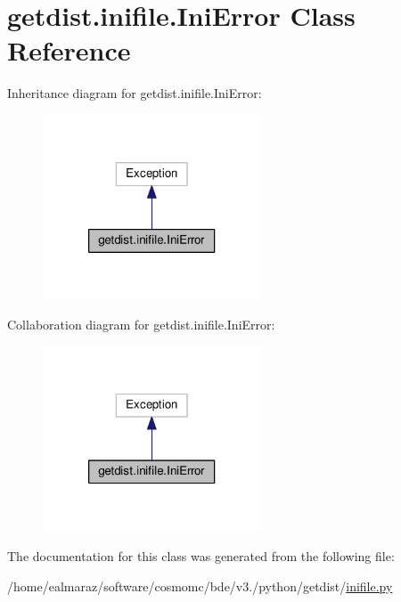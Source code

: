 \hypertarget{classgetdist_1_1inifile_1_1IniError}{}\section{getdist.\+inifile.\+Ini\+Error Class Reference}
\label{classgetdist_1_1inifile_1_1IniError}


Inheritance diagram for getdist.\+inifile.\+Ini\+Error\+:
\nopagebreak
\begin{figure}[H]
\begin{center}
\leavevmode
\includegraphics[width=184pt]{classgetdist_1_1inifile_1_1IniError__inherit__graph}
\end{center}
\end{figure}


Collaboration diagram for getdist.\+inifile.\+Ini\+Error\+:
\nopagebreak
\begin{figure}[H]
\begin{center}
\leavevmode
\includegraphics[width=184pt]{classgetdist_1_1inifile_1_1IniError__coll__graph}
\end{center}
\end{figure}


The documentation for this class was generated from the following file\+:\begin{DoxyCompactItemize}
\item 
/home/ealmaraz/software/cosmomc/bde/v3./python/getdist/\mbox{\hyperlink{inifile_8py}{inifile.\+py}}\end{DoxyCompactItemize}
